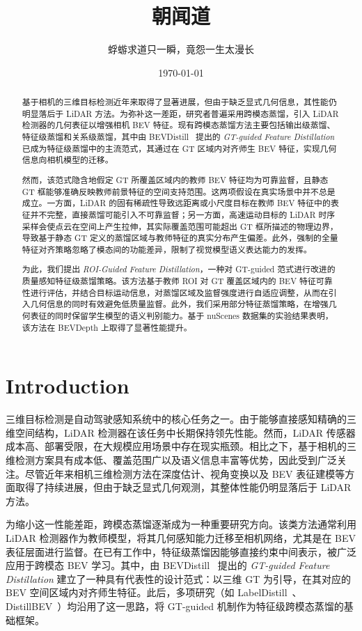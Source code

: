 \documentclass[12pt, UTF8]{ctexart}
\title{朝闻道}
\author{蜉蝣求道只一瞬，竟怨一生太漫长}
\date{\today}
\begin{document}
\maketitle


\begin{abstract}
基于相机的三维目标检测近年来取得了显著进展，但由于缺乏显式几何信息，其性能仍明显落后于 LiDAR 方法。为弥补这一差距，研究者普遍采用跨模态蒸馏，引入 LiDAR 检测器的几何表征以增强相机 BEV 特征。现有跨模态蒸馏方法主要包括输出级蒸馏、特征级蒸馏和关系级蒸馏，其中由 BEVDistill~\cite{bevdistill} 提出的 \emph{GT-guided Feature Distillation} 已成为特征级蒸馏中的主流范式，其通过在 GT 区域内对齐师生 BEV 特征，实现几何信息向相机模型的迁移。

然而，该范式隐含地假定 GT 所覆盖区域内的教师 BEV 特征均为可靠监督，且静态 GT 框能够准确反映教师前景特征的空间支持范围。这两项假设在真实场景中并不总是成立。一方面，LiDAR 的固有稀疏性导致远距离或小尺度目标在教师 BEV 特征中的表征并不完整，直接蒸馏可能引入不可靠监督；另一方面，高速运动目标的 LiDAR 时序采样会使点云在空间上产生拉伸，其实际覆盖范围可能超出 GT 框所描述的物理边界，导致基于静态 GT 定义的蒸馏区域与教师特征的真实分布产生偏差。此外，强制的全量特征对齐策略忽略了模态间的功能差异，限制了视觉模型语义表达能力的发挥。

为此，我们提出 \emph{ROI-Guided Feature Distillation}，一种对 GT-guided 范式进行改进的质量感知特征级蒸馏策略。该方法基于教师 ROI 对 GT 覆盖区域内的 BEV 特征可靠性进行评估，并结合目标运动信息，对蒸馏区域及监督强度进行自适应调整，从而在引入几何信息的同时有效避免低质量监督。此外，我们采用部分特征蒸馏策略，在增强几何表征的同时保留学生模型的语义判别能力。基于 nuScenes 数据集的实验结果表明，该方法在 BEVDepth 上取得了显著性能提升。
\end{abstract}

\section{Introduction}
三维目标检测是自动驾驶感知系统中的核心任务之一。由于能够直接感知精确的三维空间结构，LiDAR 检测器在该任务中长期保持领先性能。然而，LiDAR 传感器成本高、部署受限，在大规模应用场景中存在现实瓶颈。相比之下，基于相机的三维检测方案具有成本低、覆盖范围广以及语义信息丰富等优势，因此受到广泛关注。尽管近年来相机三维检测方法在深度估计、视角变换以及 BEV 表征建模等方面取得了持续进展，但由于缺乏显式几何观测，其整体性能仍明显落后于 LiDAR 方法。

为缩小这一性能差距，跨模态蒸馏逐渐成为一种重要研究方向。该类方法通常利用 LiDAR 检测器作为教师模型，将其几何感知能力迁移至相机网络，尤其是在 BEV 表征层面进行监督。在已有工作中，特征级蒸馏因能够直接约束中间表示，被广泛应用于跨模态 BEV 学习。其中，由 BEVDistill~\cite{bevdistill} 提出的 \emph{GT-guided Feature Distillation} 建立了一种具有代表性的设计范式：以三维 GT 为引导，在其对应的 BEV 空间区域内对齐师生特征。此后，多项研究（如 LabelDistill~\cite{labeldistill}、DistillBEV~\cite{distillbev}）均沿用了这一思路，将 GT-guided 机制作为特征级跨模态蒸馏的基础框架。
\end{document}
